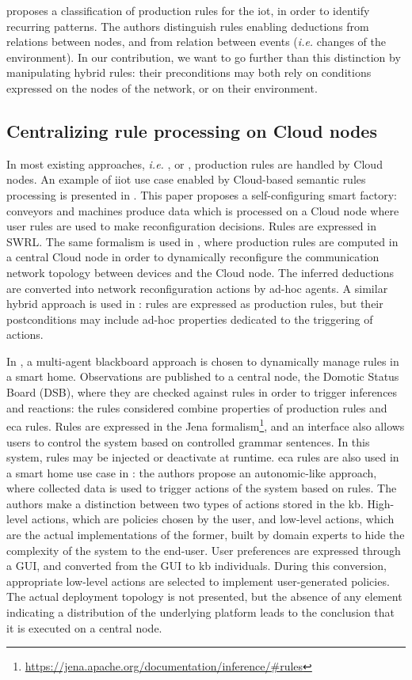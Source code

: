 \documentclass{iosart2c}
\begin{document}
\cite{Sun2014} proposes a classification of production rules for the \gls{iot}, in order to identify recurring patterns.
The authors distinguish rules enabling deductions from relations between nodes, and from relation between events (\textit{i.e.} changes of the environment).
In our contribution, we want to go further than this distinction by manipulating hybrid rules: their preconditions may both rely on conditions expressed on the nodes of the network, or on their environment.

\subsection{Centralizing rule processing on Cloud nodes}

In most existing approaches, \textit{i.e.} \cite{ZangLi55}, \cite{Gyrard2017} or \cite{xu2017network}, production rules are handled by Cloud nodes.
An example of \gls{iiot} use case enabled by Cloud-based semantic rules processing is presented in \cite{Wang2018}.
This paper proposes a self-configuring smart factory: conveyors and machines produce data which is processed on a Cloud node where user rules are used to make reconfiguration decisions.
Rules are expressed in SWRL.
The same formalism is used in \cite{Rodriguez2010}, where production rules are computed in a central Cloud node in order to dynamically reconfigure the communication network topology between devices and the Cloud node.
The inferred deductions are converted into network reconfiguration actions by ad-hoc agents.
A similar hybrid approach is used in \cite{Evchina2015}: rules are expressed as production rules, but their postconditions may include ad-hoc properties dedicated to the triggering of actions.

In \cite{Kasnesis2015}, a multi-agent blackboard approach is chosen to dynamically manage rules in a smart home. 
Observations are published to a central node, the Domotic Status Board (DSB), where they are checked against rules in order to trigger inferences and reactions: the rules considered combine properties of production rules and \gls{eca} rules.
Rules are expressed in the Jena formalism\footnote{\url{https://jena.apache.org/documentation/inference/\#rules}}, and an interface also allows users to control the system based on controlled grammar sentences.
In this system, rules may be injected or deactivate at runtime.
\gls{eca} rules are also used in a smart home use case in \cite{Mainetti2015}: the authors propose an autonomic-like approach, where collected data is used to trigger actions of the system based on rules.
The authors make a distinction between two types of actions stored in the \gls{kb}. 
High-level actions, which are policies chosen by the user, and low-level actions, which are the actual implementations of the former, built by domain experts to hide the complexity of the system to the end-user.
User preferences are expressed through a GUI, and converted from the GUI to \gls{kb} individuals. 
During this conversion, appropriate low-level actions are selected to implement user-generated policies.
The actual deployment topology is not presented, but the absence of any element indicating a distribution of the underlying platform leads to the conclusion that it is executed on a central node.
\end{document}
